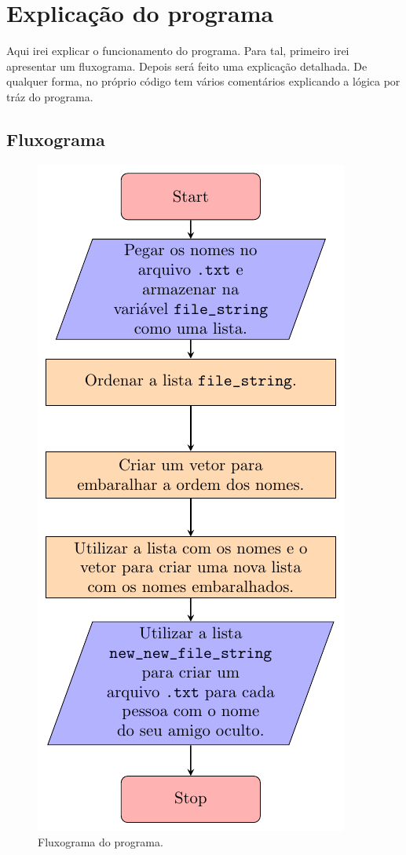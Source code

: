 
\section{Explicação do programa}

Aqui irei explicar o funcionamento do programa.
Para tal, primeiro irei apresentar um fluxograma.
Depois será feito uma explicação detalhada.
De qualquer forma, no próprio código tem vários comentários explicando a lógica por tráz do programa.

\subsection{Fluxograma}

\begin{figure}[H]
\centering
\includegraphics[scale=1.4]{00_7_imagem_1}
\caption{Fluxograma do programa.}
\end{figure}

